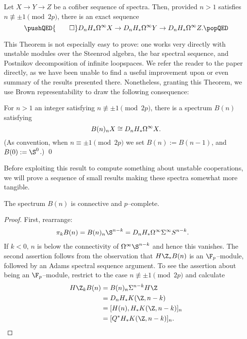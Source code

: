 \begin{theorem}
Let $X \to Y \to Z$ be a cofiber sequence of spectra.  Then, provided $n > 1$ satisfies $n \not\equiv \pm 1 \pmod{2p}$, there is an exact sequence
\[\pushQED{\qed}
D_n H_* \Loops^\infty X \to D_n H_* \Loops^\infty Y \to D_n H_* \Loops^\infty Z. \qedhere
\popQED\]
\end{theorem}

\noindent This Theorem is not especially easy to prove: one works very directly with unstable modules over the Steenrod algebra, the bar spectral sequence, and Postnikov decomposition of infinite loopspaces.  We refer the reader to the paper directly, as we have been unable to find a useful improvement upon or even summary of the results presented there.  Nonetheless, granting this Theorem, we use Brown representability to draw the following consequence:

\begin{corollary}\label{BrownGitlerSpectraDefn}
For $n > 1$ an integer satisfying $n \not\equiv \pm 1 \pmod{2p}$, there is a spectrum $B(n)$ satisfying \[B(n)_n X \cong D_n H_* \Omega^\infty X.\] (As convention, when $n \equiv \pm 1 \pmod{2p}$ we set $B(n) := B(n-1)$, and $B(0) := \S^0$.) \qed
\end{corollary}

Before exploiting this result to compute something about unstable cooperations, we will prove a sequence of small results making these spectra somewhat more tangible.

\begin{lemma}
The spectrum $B(n)$ is connective and $p$--complete.
\end{lemma}
\begin{proof}
First, rearrange:
\begin{align*}
\pi_k B(n) & = B(n)_n \S^{n-k} = D_n H_* \Loops^\infty \Susp^\infty S^{n-k}.
\end{align*}
If $k < 0$, $n$ is below the connectivity of $\Loops^\infty \S^{n-k}$ and hence this vanishes.  The second assertion follows from the observation that $H\Z_* B(n)$ is an $\F_p$--module, followed by an Adams spectral sequence argument.  To see the assertion about being an $\F_p$--module, restrict to the case $n \not\equiv \pm 1 \pmod{2p}$ and calculate
\begin{align*}
H\Z_k B(n) & = B(n)_n \Susp^{n-k} H\Z \\
& = D_n H_* K(\Z, n-k) \\
& = [H(n), H_* K(\Z, n-k)]_n \\
& = [Q^* H_* K(\Z, n-k)]_n. \qedhere
\end{align*}
\end{proof}

